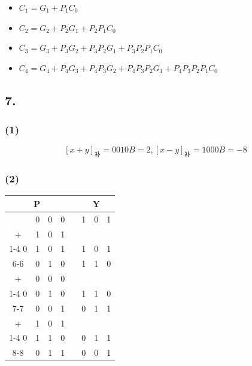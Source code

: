 \documentclass[12pt, a4paper]{ctexart}
\begin{document}
\begin{itemize}
    \item $C_1=G_1+P_1C_0$
    \item $C_2=G_2+P_2G_1+P_2P_1C_0$
    \item $C_3=G_3+P_3G_2+P_3P_2G_1+P_3P_2P_1C_0$
    \item $C_4=G_4+P_4G_3+P_4P_3G_2+P_4P_3P_2G_1+P_4P_3P_2P_1C_0$
\end{itemize}

\subsection*{7.}

\subsubsection*{(1)}

\begin{equation}
    \left[x+y\right]_\text{补}=0010B=2,
    \left[x-y\right]_\text{补}=1000B=-8
\end{equation}

\subsubsection*{(2)}

\begin{table}[H]
    \centering
    \begin{tabular}{cccccccc}
        \hline
        \multicolumn{4}{c}{P} && \multicolumn{3}{c}{Y} \\
        \hline
          & 0&0&0 &\multicolumn{1}{c|}{}& 1&0&1 \\ \hdashline
        + & 1&0&1 &\multicolumn{1}{c|}{}&       \\ \cline{1-4}
        0 & 1&0&1 &\multicolumn{1}{c|}{}& 1&0&1 \\ \cline{6-6}
          & 0&1&0 && \multicolumn{1}{c|}{1}&1&0 \\ \hdashline
        + & 0&0&0 && \multicolumn{1}{c|}{}      \\ \cline{1-4}
        0 & 0&1&0 && \multicolumn{1}{c|}{1}&1&0 \\ \cline{7-7}
          & 0&0&1 && 0&\multicolumn{1}{c|}{1}&1 \\ \hdashline
        + & 1&0&1 && \multicolumn{2}{c|}{}      \\ \cline{1-4}
        0 & 1&1&0 && 0&\multicolumn{1}{c|}{1}&1 \\ \cline{8-8}
          & 0&1&1 && 0&0&\multicolumn{1}{c|}{1} \\ \hline
    \end{tabular}
\end{table}
\end{document}
